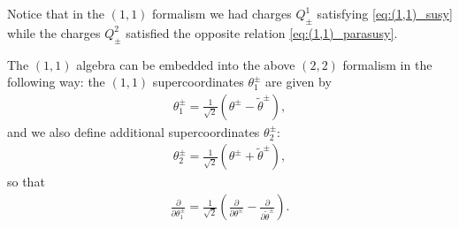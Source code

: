 \documentclass{article}
\newcommand{\p}{\partial}
\newcommand{\tth}{\tl{\theta}}
\def\tl{\tilde}
\theoremstyle{definition}
\theoremstyle{definition}
\theoremstyle{remark}
\begin{document}
Notice that in the $(1,1)$ formalism we had charges $Q^1_\pm$ satisfying \eqref{eq:(1,1)_susy} while the charges $Q^2_\pm$ satisfied the opposite relation \eqref{eq:(1,1)_parasusy}.

The $(1,1)$ algebra can be embedded into the above $(2,2)$ formalism in the following way: the $(1,1)$ supercoordinates $\theta_1^\pm$ are given by
\begin{align*}
\theta_1^\pm=\frac{1}{\sqrt{2}}(\theta^\pm-\tth^\pm),
\end{align*}
and we also define additional supercoordinates $\theta_2^\pm$:
\begin{align*}
\theta_2^\pm=\frac{1}{\sqrt{2}}(\theta^\pm+\tth^\pm),
\end{align*}
so that
\begin{align*}
\frac{\p}{\p \theta_1^\pm}=\frac{1}{\sqrt{2}}(\frac{\p}{\p \theta^\pm}-\frac{\p}{\p \tth^\pm}).
\end{align*}
\end{document}
